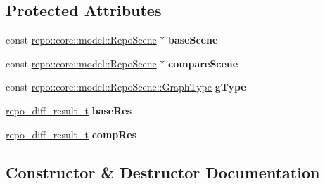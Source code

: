 \subsection*{Protected Attributes}
\begin{DoxyCompactItemize}
\item 
\hypertarget{classrepo_1_1manipulator_1_1diff_1_1_abstract_diff_a8802318cb00d911138bb22e7ca174d32}{}const \hyperlink{classrepo_1_1core_1_1model_1_1_repo_scene}{repo\+::core\+::model\+::\+Repo\+Scene} $\ast$ {\bfseries base\+Scene}\label{classrepo_1_1manipulator_1_1diff_1_1_abstract_diff_a8802318cb00d911138bb22e7ca174d32}

\item 
\hypertarget{classrepo_1_1manipulator_1_1diff_1_1_abstract_diff_a78910dd93c9a275198113faf6f2f99be}{}const \hyperlink{classrepo_1_1core_1_1model_1_1_repo_scene}{repo\+::core\+::model\+::\+Repo\+Scene} $\ast$ {\bfseries compare\+Scene}\label{classrepo_1_1manipulator_1_1diff_1_1_abstract_diff_a78910dd93c9a275198113faf6f2f99be}

\item 
\hypertarget{classrepo_1_1manipulator_1_1diff_1_1_abstract_diff_ac2d749de6ca04418cdaa8ea8f7f0b2c0}{}const \hyperlink{classrepo_1_1core_1_1model_1_1_repo_scene_aefcacd6eb4c7774ac1bfe3a6b223337c}{repo\+::core\+::model\+::\+Repo\+Scene\+::\+Graph\+Type} {\bfseries g\+Type}\label{classrepo_1_1manipulator_1_1diff_1_1_abstract_diff_ac2d749de6ca04418cdaa8ea8f7f0b2c0}

\item 
\hypertarget{classrepo_1_1manipulator_1_1diff_1_1_abstract_diff_aafc9a406ae0d81c3fa22ce360f6ae977}{}\hyperlink{structrepo__diff__result__t}{repo\+\_\+diff\+\_\+result\+\_\+t} {\bfseries base\+Res}\label{classrepo_1_1manipulator_1_1diff_1_1_abstract_diff_aafc9a406ae0d81c3fa22ce360f6ae977}

\item 
\hypertarget{classrepo_1_1manipulator_1_1diff_1_1_abstract_diff_a76f8b662a075357d1b2700fdff728764}{}\hyperlink{structrepo__diff__result__t}{repo\+\_\+diff\+\_\+result\+\_\+t} {\bfseries comp\+Res}\label{classrepo_1_1manipulator_1_1diff_1_1_abstract_diff_a76f8b662a075357d1b2700fdff728764}

\end{DoxyCompactItemize}


\subsection{Constructor \& Destructor Documentation}
\hypertarget{classrepo_1_1manipulator_1_1diff_1_1_abstract_diff_a749b6fb18947b6bf78e6b1a59917ef86}{}
